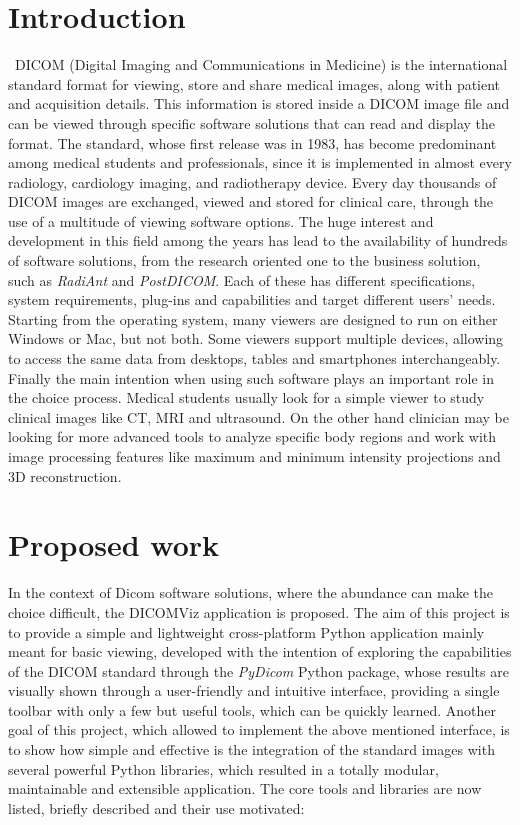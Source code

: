 \documentclass[conference]{IEEEtran}
\begin{document}
\section{Introduction}\
DICOM (Digital Imaging and Communications in Medicine)\cite{b1} is the international standard format for viewing, store and share medical images, along with patient and acquisition details. This information is stored inside a DICOM image file and can be viewed through specific software solutions that can read and display the format. The standard, whose first release was in 1983, has become predominant among medical students and professionals, since it is implemented in almost every radiology, cardiology imaging, and radiotherapy device. Every day thousands of DICOM images are exchanged, viewed and stored for clinical care, through the use of a multitude of viewing software options. The huge interest and development in this field among the years has lead to the availability of hundreds of software solutions, from the research oriented one to the business solution, such as  \textit{RadiAnt}\cite{b2} and  \textit{PostDICOM}\cite{b3}. Each of these has different specifications, system requirements, plug-ins and capabilities and target different users' needs. Starting from the operating system, many viewers are designed to run on either Windows or Mac, but not both. Some viewers support multiple devices, allowing to access the same data from desktops, tables and smartphones interchangeably. Finally the main intention when using such software plays an important role in the choice process. Medical students usually look for a simple viewer to study clinical images like CT, MRI and ultrasound. On the other hand clinician may be looking for more advanced tools to analyze specific body regions and work with image processing features like maximum and minimum intensity projections and 3D reconstruction.


\section{Proposed work}
In the context of Dicom software solutions, where the abundance can make the choice difficult, the DICOMViz application is proposed. The aim of this project is to provide a simple and lightweight cross-platform Python application mainly meant for basic viewing, developed with the intention of exploring the capabilities of the DICOM standard through the  \textit{PyDicom} Python package\cite{b5}, whose results are visually shown through a user-friendly and intuitive interface, providing a single toolbar with only a few but useful tools, which can be quickly learned. Another goal of this project, which allowed to implement the above mentioned interface, is to show how simple and effective is the integration of the standard images with several powerful Python libraries, which resulted in a totally modular, maintainable and extensible application. The core tools and libraries are now listed, briefly described
and their use motivated:
\end{document}
